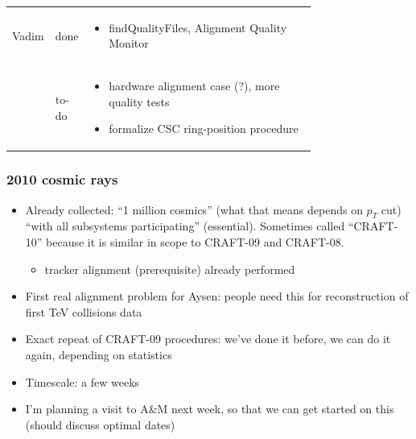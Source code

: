 \documentclass[compress]{beamer}
\begin{document}
\begin{frame}
\begin{tabular}{l l p{0.75\linewidth}}
Vadim & done & \vspace{-1.5\baselineskip}\begin{itemize}
\item findQualityFiles, Alignment Quality Monitor
\end{itemize} \\
& to-do & \vspace{-1.5\baselineskip}\begin{itemize}
\item hardware alignment case (?), more quality tests
\item formalize CSC ring-position procedure
\end{itemize} \\
\end{tabular}


\end{frame}

\begin{frame}
\frametitle{2010 cosmic rays}

\begin{itemize}
\item Already collected: ``1 million cosmics'' (what that means
  depends on $p_T$ cut) ``with all subsystems participating''
  (essential).  Sometimes called ``CRAFT-10'' because it is similar in
  scope to CRAFT-09 and CRAFT-08.
\begin{itemize}
\item tracker alignment (prerequisite) already performed
\end{itemize}
\item First real alignment problem for Aysen: people need this for
  reconstruction of first TeV collisions data
\item Exact repeat of CRAFT-09 procedures: we've done it before, we can
  do it again, depending on statistics
\item Timescale: a few weeks
\item I'm planning a visit to A\&M next week, so that we can get
  started on this (should discuss optimal dates)
\end{itemize}
\end{frame}
\end{document}

